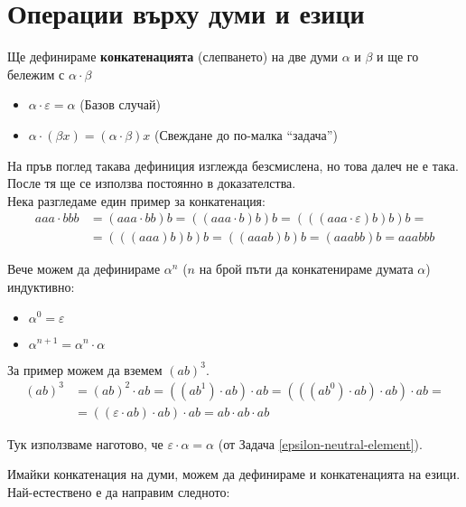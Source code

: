 \section{Операции върху думи и езици}

\begin{definition}
    Ще дефинираме \textbf{конкатенацията} (слепването) на две думи $\alpha$ и $\beta$
    и ще го бележим с $\alpha \cdot \beta$
    \begin{itemize}
        \item $\alpha \cdot \varepsilon = \alpha$ (Базов случай)
        \item $\alpha \cdot (\beta x) = (\alpha \cdot \beta)x$ (Свеждане до по-малка ``задача'')
    \end{itemize}
\end{definition}

На пръв поглед такава дефиниция изглежда безсмислена,
но това далеч не е така.
После тя ще се използва постоянно в доказателства. \\

Нека разгледаме един пример за конкатенация:
\begin{align*}
    aaa \cdot bbb & = (aaa \cdot bb)b = ((aaa \cdot b)b)b = (((aaa \cdot \varepsilon)b)b)b = \\
                  & = (((aaa)b)b)b = ((aaab)b)b = (aaabb)b = aaabbb
\end{align*}

Вече можем да дефинираме $\alpha^n$ ($n$ на брой пъти да конкатенираме думата $\alpha$) индуктивно:
\begin{itemize}
    \item $\alpha^0 = \varepsilon$
    \item $\alpha^{n + 1} = \alpha^n \cdot \alpha$
\end{itemize}

За пример можем да вземем $(ab)^3$.
\begin{align*}
    (ab)^3 & = (ab)^2 \cdot ab = ((ab^1) \cdot ab) \cdot ab = (((ab^0) \cdot ab) \cdot ab) \cdot ab = \\
           & = ((\varepsilon \cdot ab) \cdot ab) \cdot ab = ab \cdot ab \cdot ab
\end{align*}

\begin{remark}
    Тук използваме наготово, че $\varepsilon \cdot \alpha = \alpha$ (от Задача \ref{epsilon-neutral-element}).
\end{remark}

Имайки конкатенация на думи, можем да дефинираме и конкатенацията на езици.
Най-естествено е да направим следното:


